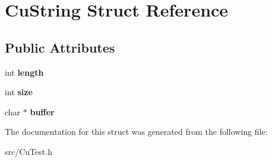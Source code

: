 \hypertarget{struct_cu_string}{}\section{Cu\+String Struct Reference}
\label{struct_cu_string}
\subsection*{Public Attributes}
\begin{DoxyCompactItemize}
\item 
\mbox{\label{struct_cu_string_a5e715d2b207fe60a0433e8bf0ed0e470}} 
int {\bfseries length}
\item 
\mbox{\label{struct_cu_string_abddb898dd12ac916879510d4c4c97f05}} 
int {\bfseries size}
\item 
\mbox{\label{struct_cu_string_ab202a8630764f5864030f8a8a4ae6911}} 
char $\ast$ {\bfseries buffer}
\end{DoxyCompactItemize}


The documentation for this struct was generated from the following file\+:\begin{DoxyCompactItemize}
\item 
src/Cu\+Test.\+h\end{DoxyCompactItemize}

